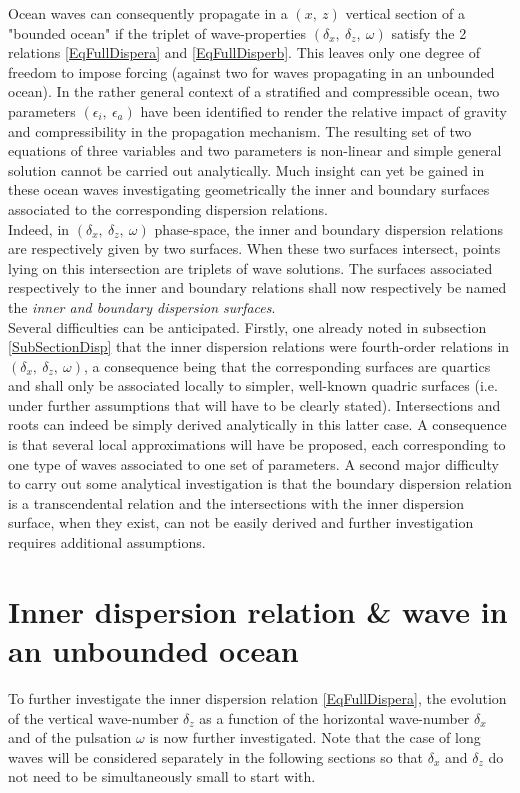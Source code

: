 \documentclass[a4paper,11pt]{article}
\begin{document}
Ocean waves can consequently propagate in a $(x,\ z)$ vertical section of a "bounded ocean" if the triplet of wave-properties $(\delta_x,\ \delta_z,\ \omega)$ satisfy the 2 relations \ref{EqFullDispera} and \ref{EqFullDisperb}. This leaves only one degree of freedom to impose forcing (against two for waves propagating in an unbounded ocean). In the rather general context of a stratified and compressible ocean, two parameters $(\epsilon_i,\ \epsilon_a)$ have been identified to render the relative impact of gravity and compressibility in the propagation mechanism. The resulting set of two equations of three variables and two parameters is non-linear and simple general solution cannot be carried out analytically. Much insight can yet be gained in these ocean waves investigating geometrically the inner and boundary surfaces associated to the corresponding dispersion relations. \\
Indeed, in $(\delta_x,\  \delta_z,\ \omega)$ phase-space, the inner and boundary dispersion relations are respectively given by two surfaces. When these two surfaces intersect, points lying on this intersection are triplets of wave solutions. The surfaces associated respectively to the inner and boundary relations shall now respectively be named the \textit{inner and boundary dispersion surfaces}.\\

Several difficulties can be anticipated. Firstly, one already noted in subsection \ref{SubSectionDisp} that the inner dispersion relations were fourth-order relations in $(\delta_x,\ \delta_z,\ \omega)$, a consequence being that the corresponding surfaces are quartics and shall only be associated locally to simpler, well-known quadric surfaces (i.e. under further assumptions that will have to be clearly stated). Intersections and roots can indeed be simply derived analytically in this latter case. A consequence is that several local approximations will have be proposed, each corresponding to one type of waves associated to one set of parameters. A second major difficulty to carry out some analytical investigation is that the boundary dispersion relation is a transcendental relation and the intersections with the inner dispersion surface, when they exist, can not be easily derived and further investigation  requires additional assumptions.\\ 
\newpage

\section{Inner dispersion relation \& wave in an unbounded ocean}
To further investigate the inner dispersion relation \ref{EqFullDispera}, the evolution of the vertical wave-number $\delta_z$ as a function of the horizontal wave-number $\delta_x$ and of the pulsation $\omega$ is now further investigated. Note that the case of long waves will be considered separately in the following sections so that $\delta_x$ and $\delta_z$ do not need to be simultaneously small to start with.
\end{document}
